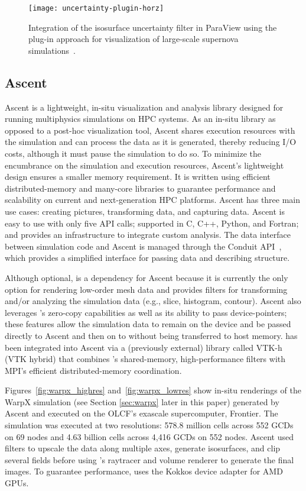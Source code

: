 \begin{figure*}[htb]
  \texttt{[image: uncertainty-plugin-horz]}
  \caption{Integration of the \vtkm isosurface uncertainty filter in ParaView using the plug-in approach for visualization of large-scale supernova simulations~\citep{Sandoval2021}.}
  \label{fig:uncertainty-plugin}
\end{figure*}

\subsection{Ascent}

Ascent is a lightweight, in-situ visualization and analysis library designed for running multiphysics simulations on HPC systems. As an in-situ library as opposed to a post-hoc visualization tool, Ascent shares execution resources with the simulation and can process the data as it is generated, thereby reducing I/O costs, although it must pause the simulation to do so. To minimize the encumbrance on the simulation and execution resources, Ascent's lightweight design ensures a smaller memory requirement. It is written using efficient distributed-memory and many-core libraries to guarantee performance and scalability on current and next-generation HPC platforms. Ascent has three main use cases: creating pictures, transforming data, and capturing data. Ascent is easy to use with only five API calls; supported in C, C++, Python, and Fortran; and provides an infrastructure to integrate custom analysis.
The data interface between simulation code and Ascent is managed through the Conduit API~\citep{Harrison2022}, which provides a simplified interface for passing data and describing structure.

Although optional, \vtkm is a dependency for Ascent because it is currently the only option for rendering low-order mesh data and provides filters for transforming and/or analyzing the simulation data (e.g.,
slice, histogram, contour).
Ascent also leverages \vtkm's zero-copy capabilities as well as its ability to pass device-pointers; these features allow the simulation data to remain on the device and be passed directly to Ascent and then on to \vtkm without being transferred to host memory.
\vtkm has been integrated into Ascent via a (previously external) library called VTK-h (VTK hybrid) that combines \vtkm's shared-memory, high-performance filters with MPI's efficient distributed-memory coordination.

Figures~\ref{fig:warpx_highres} and~\ref{fig:warpx_lowres} show in-situ renderings of the WarpX simulation (see Section \ref{sec:warpx} later in this paper) generated by Ascent and executed on the OLCF's exascale supercomputer, Frontier.
The simulation was executed at two resolutions: 578.8 million cells across 552 GCDs on 69 nodes and 4.63 billion cells across 4,416 GCDs on 552 nodes.
Ascent used \vtkm filters to upscale the data along multiple axes, generate isosurfaces, and clip several fields before using \vtkm's raytracer and volume renderer to generate the final images.
To guarantee performance, \vtkm uses the Kokkos device adapter for AMD GPUs. 

